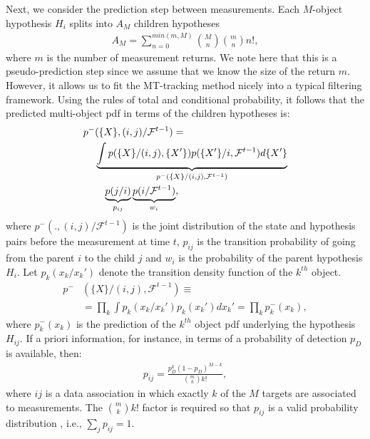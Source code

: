 \documentclass[10pt, conference]{IEEEtran}
\begin{document}
Next, we consider the prediction step between measurements. Each $M$-object hypothesis $H_i$ splits into $A_M$ children hypotheses
\begin{align}\label{n_da}
A_M = \sum_{n=0}^{min(m,M)} {M \choose n} {m \choose n} n!,
\end{align}
where $m$ is the number of measurement returns. We note here that this is a pseudo-prediction step since we assume that we know the size of the return $m$. However, it allows us to fit the MT-tracking method nicely into a typical filtering framework.
Using the rules of total and conditional probability, it follows that the predicted multi-object pdf in terms of the children hypotheses is:
\begin{align} \label{FISST_pred}
p^-&(\{X\}, (i,j)/ \mathcal{F}^{t-1}) = \nonumber\\
&\underbrace{\int p(\{X\}/(i,j), \{X'\})p(\{X'\}/ i, \mathcal{F}^{t-1}) d\{X'\}}_{p^-(\{X\}/ (i,j), \mathcal{F}^{t-1})}\nonumber\\
&\hspace{2ex}\underbrace{p(j/ i)}_{p_{ij}} 
\underbrace{p(i/ \mathcal{F}^{t-1})}_{w_i},
\end{align}
where $p^{-}(., (i,j)/ \mathcal{F}^{t-1})$ is the joint distribution of the state and hypothesis pairs before the measurement at time $t$, $p_{ij}$ is the transition probability of going from the parent $i$ to the child $j$ and $w_i$ is the probability of the parent hypothesis $H_i$.  Let $p_k(x_k/ x_k')$ denote the transition density function of the $k^{th}$ object. 
\begin{align}
p^-&(\{X\}/ (i,j), \mathcal{F}^{t-1}) \equiv \nonumber\\
&= \prod_ k \int p_k(x_k/ x_k') p_k(x_k') dx_k' = \prod_k p_k^-(x_k),
\end{align}
where $p_k^-(x_k)$ is the prediction of the $k^{th}$ object pdf underlying the hypothesis $H_{ij}$. 
If a priori information, for instance, in terms of a probability of detection $p_D$ is available, then:
\begin{align} \label{hyp_prior_wt}
p_{ij} = \frac{p_D^k (1-p_D)^{M-k}}{{m\choose k} k!},
\end{align}
where $ij$ is a data association in which exactly $k$ of the $M$ targets are associated to measurements. The ${m\choose k} k!$ factor is required so that $p_{ij}$ is a valid probability distribution , i.e., $\sum_j p_{ij} = 1$. 
\end{document}
